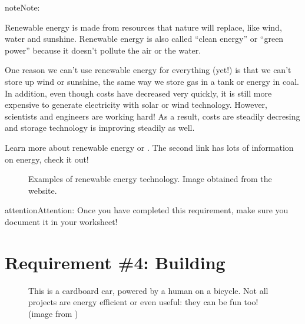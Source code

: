 \documentclass[letterpaper,10pt,english,openany,oneside]{sphinxmanual}
\let\sphinxpxdimen\pdfpxdimen\else\newdimen\sphinxpxdimen
\begin{document}
\begin{sphinxadmonition}{note}{Note:}

Renewable energy is made from resources that nature will replace, like wind, water and sunshine. Renewable energy is also called “clean energy” or “green power” because it doesn’t pollute the air or the water.

One reason we can’t use renewable energy for everything (yet!) is that we can’t store up wind or sunshine, the same way we store gas in a tank or energy in coal. In addition, even though costs have decreased very quickly, it is still more expensive to generate electricity with solar or wind technology. However, scientists and engineers are working hard! As a result, costs are steadily decresing and storage technology is improving steadily as well.

Learn more about renewable energy  or . The second link has lots of information on energy, check it out!

\begin{figure}[H]
\centering
\capstart

\noindent\sphinxincludegraphics[width=400\sphinxpxdimen]{{renewable}.png}
\caption{Examples of renewable energy technology.  Image obtained from the   website.}\label{\detokenize{requirement3:id1}}\end{figure}
\end{sphinxadmonition}

\begin{sphinxadmonition}{attention}{Attention:}
Once you have completed this requirement, make sure you document it in your worksheet!
\end{sphinxadmonition}


\chapter{Requirement \#4: Building}
\label{\detokenize{requirement4:requirement-4-building}}\label{\detokenize{requirement4::doc}}
\begin{figure}[htbp]
\centering
\capstart

\noindent\sphinxincludegraphics[width=400\sphinxpxdimen]{{CardboardCar}.jpg}
\caption{This is a cardboard car, powered by a human on a bicycle. Not all projects are energy efficient or even useful: they can be fun too! (image from )}\label{\detokenize{requirement4:id1}}\end{figure}
\end{document}
